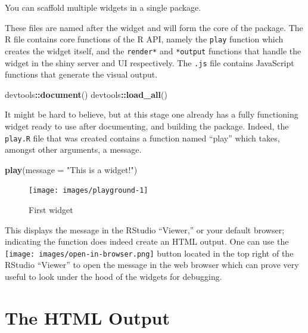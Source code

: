 \documentclass[
  10pt,
]{krantz}
\makeatletter
\newenvironment{Shaded}{\begin{snugshade}}{\end{snugshade}}
\newcommand{\DataTypeTok}[1]{\textcolor[rgb]{0.27,0.27,0.27}{#1}}
\newcommand{\KeywordTok}[1]{\textcolor[rgb]{0.27,0.27,0.27}{\textbf{#1}}}
\newcommand{\NormalTok}[1]{#1}
\newcommand{\OperatorTok}[1]{\textcolor[rgb]{0.43,0.43,0.43}{\textbf{#1}}}
\newcommand{\StringTok}[1]{\textcolor[rgb]{0.5,0.5,0.5}{#1}}
\newenvironment{kframe}{%
\medskip{}
\setlength{\fboxsep}{.8em}
 \def\at@end@of@kframe{}%
 \ifinner\ifhmode%
  \def\at@end@of@kframe{\end{minipage}}%
  \begin{minipage}{\columnwidth}%
 \fi\fi%
 \def\FrameCommand##1{\hskip\@totalleftmargin \hskip-\fboxsep
 \colorbox{shadecolor}{##1}\hskip-\fboxsep
     \hskip-\linewidth \hskip-\@totalleftmargin \hskip\columnwidth}%
 \MakeFramed {\advance\hsize-\width
   \@totalleftmargin\z@ \linewidth\hsize
   \@setminipage}}%
 {\par\unskip\endMakeFramed%
 \at@end@of@kframe}
\renewenvironment{Shaded}{\begin{kframe}}{\end{kframe}}
\newenvironment{rmdblock}[1]
  {
  \begin{itemize}
  \renewcommand{\labelitemi}{
    \raisebox{-.7\height}[0pt][0pt]{
      {\setkeys{Gin}{width=3em,keepaspectratio}\texttt{[image: images/\#1]}}
    }
  }
  \setlength{\fboxsep}{1em}
  \begin{kframe}
  \item
  }
  {
  \end{kframe}
  \end{itemize}
  }
\newenvironment{rmdnote}
  {\begin{rmdblock}{note}}
  {\end{rmdblock}}
\makeatother
\begin{document}
\begin{rmdnote}
You can scaffold multiple widgets in a single package.
\end{rmdnote}

These files are named after the widget and will form the core of the package. The R file contains core functions of the R API, namely the \texttt{play} function which creates the widget itself, and the \texttt{render*} and \texttt{*output} functions that handle the widget in the shiny server and UI respectively. The \texttt{.js} file contains JavaScript functions that generate the visual output.

\begin{Shaded}
\begin{Highlighting}[]
\NormalTok{devtools}\OperatorTok{::}\KeywordTok{document}\NormalTok{()}
\NormalTok{devtools}\OperatorTok{::}\KeywordTok{load\_all}\NormalTok{()}
\end{Highlighting}
\end{Shaded}

It might be hard to believe, but at this stage one already has a fully functioning widget ready to use after documenting, and building the package. Indeed, the \texttt{play.R} file that was created contains a function named ``play'' which takes, amongst other arguments, a message.

\begin{Shaded}
\begin{Highlighting}[]
\KeywordTok{play}\NormalTok{(}\DataTypeTok{message =} \StringTok{"This is a widget!"}\NormalTok{)}
\end{Highlighting}
\end{Shaded}

\begin{figure}[H]

{\centering \texttt{[image: images/playground-1]} 

}

\caption{First widget}\label{fig:playground-1}
\end{figure}

This displays the message in the RStudio ``Viewer,'' or your default browser; indicating the function does indeed create an HTML output. One can use the \texttt{[image: images/open-in-browser.png]} button located in the top right of the RStudio ``Viewer'' to open the message in the web browser which can prove very useful to look under the hood of the widgets for debugging.

\hypertarget{widgets-first-htmloutput}{%
\section{The HTML Output}\label{widgets-first-htmloutput}}
\end{document}
